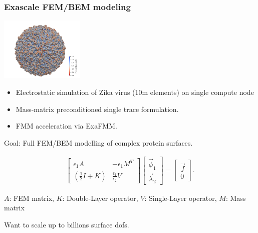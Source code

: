 \documentclass[dvipsnames,10pt]{beamer}
\begin{document}
\begin{frame}
\frametitle{Exascale FEM/BEM modeling}

\vspace{\baselineskip}

\begin{minipage}{5cm}
    \begin{center}
        \includegraphics[width=4cm]{../figs/6CO8_potential.png}
    \end{center}
\end{minipage}
\begin{minipage}{5cm}
\small
\begin{itemize}
\item Electrostatic simulation of Zika virus (10m elements) on single compute node\footnotemark
\item Mass-matrix preconditioned single trace formulation.
\item FMM acceleration via ExaFMM.
\end{itemize}
\end{minipage}

\vspace{\baselineskip}

Goal: Full FEM/BEM modelling of complex protein surfaces.

\begin{align*}
\begin{bmatrix}
\epsilon_1 A &  - \epsilon_1 M^T \\
\left(\tfrac12 I + K \right) &  \tfrac{\epsilon_1}{\epsilon_2} V
\end{bmatrix}
\begin{bmatrix}
\vec{\phi}_1 \\
\vec{\lambda}_2
\end{bmatrix}
=
\begin{bmatrix}
\vec{f} \\
0
\end{bmatrix}.
\end{align*}

$A$: FEM matrix, $K$: Double-Layer operator, $V$: Single-Layer operator, $M$: Mass matrix

\begin{tcolorbox}
Want to scale up to billions surface dofs.
\end{tcolorbox}

\end{frame}
\end{document}
